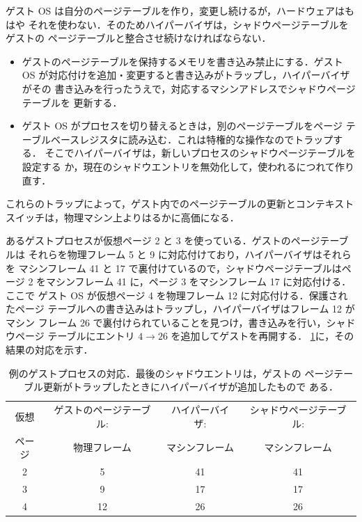 \documentclass[../main.tex]{subfiles}
\begin{document}
ゲスト OS は自分のページテーブルを作り，変更し続けるが，ハードウェアはもはや
それを使わない．そのためハイパーバイザは，シャドウページテーブルをゲストの
ページテーブルと整合させ続けなければならない．
\begin{itemize}
  \item ゲストのページテーブルを保持するメモリを書き込み禁止にする．ゲスト OS
    が対応付けを追加・変更すると書き込みがトラップし，ハイパーバイザがその
    書き込みを行ったうえで，対応するマシンアドレスでシャドウページテーブルを
    更新する．
  \item ゲスト OS がプロセスを切り替えるときは，別のページテーブルをページ
    テーブルベースレジスタに読み込む．これは特権的な操作なのでトラップする．
    そこでハイパーバイザは，新しいプロセスのシャドウページテーブルを設定する
    か，現在のシャドウエントリを無効化して，使われるにつれて作り直す．
\end{itemize}
これらのトラップによって，ゲスト内でのページテーブルの更新とコンテキスト
スイッチは，物理マシン上よりはるかに高価になる．

\begin{example}
  あるゲストプロセスが仮想ページ 2 と 3 を使っている．ゲストのページテーブルは
  それらを物理フレーム 5 と 9 に対応付けており，ハイパーバイザはそれらを
  マシンフレーム 41 と 17 で裏付けているので，シャドウページテーブルはページ 2
  をマシンフレーム 41 に，ページ 3 をマシンフレーム 17 に対応付ける．ここで
  ゲスト OS が仮想ページ 4 を物理フレーム 12 に対応付ける．保護されたページ
  テーブルへの書き込みはトラップし，ハイパーバイザはフレーム 12 がマシン
  フレーム 26 で裏付けられていることを見つけ，書き込みを行い，シャドウページ
  テーブルにエントリ $4 \to 26$ を追加してゲストを再開する．
  \cref{tab:l12-shadow}に，その結果の対応を示す．
\end{example}

\begin{table}[htbp]
  \centering
  \caption{例のゲストプロセスの対応．最後のシャドウエントリは，ゲストの
    ページテーブル更新がトラップしたときにハイパーバイザが追加したもので
    ある．}
  \label{tab:l12-shadow}
  \small
  \begin{tabular}{@{}cccc@{}}
    \toprule
    仮想 & ゲストのページテーブル: & ハイパーバイザ: & シャドウページテーブル: \\
    ページ & 物理フレーム & マシンフレーム & マシンフレーム \\
    \midrule
    2 & 5  & 41 & 41 \\
    3 & 9  & 17 & 17 \\
    4 & 12 & 26 & 26 \\
    \bottomrule
  \end{tabular}
\end{table}
\end{document}
